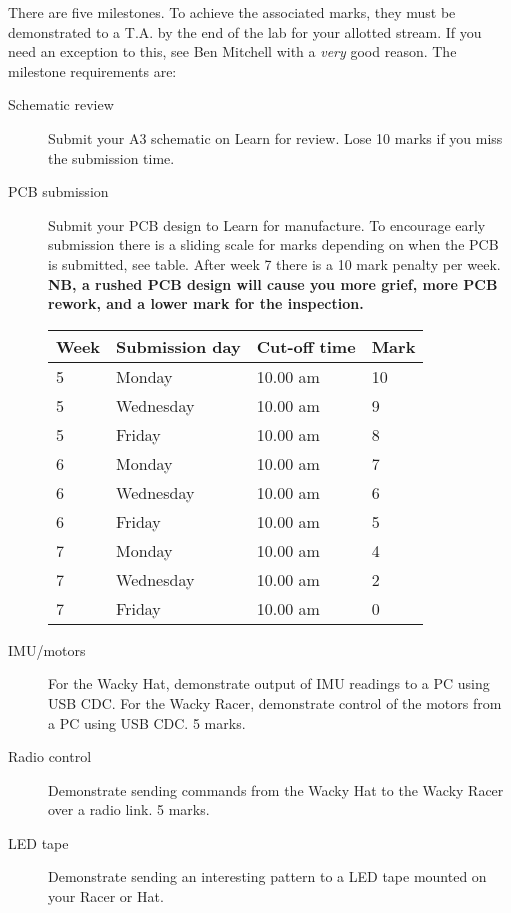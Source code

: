 \documentclass[11pt, a4paper]{article}
\begin{document}
There are five milestones.  To achieve the associated marks, they must
be demonstrated to a T.A. by the end of the lab for your allotted
stream.  If you need an exception to this, see Ben Mitchell with a
\emph{very} good reason.  The milestone requirements are:
%
\begin{description}
\item [Schematic review] Submit your A3 schematic on Learn for
  review.  Lose 10 marks if you miss the submission time.

\item [PCB submission] Submit your PCB design to Learn for
  manufacture.  To encourage early submission there is a sliding scale
  for marks depending on when the PCB is submitted, see table.  After
  week 7 there is a 10 mark penalty per week.  \textbf{NB, a rushed
    PCB design will cause you more grief, more PCB rework, and a lower
    mark for the inspection.}

  \begin{tabular}{llll}
    Week & Submission day & Cut-off time  & Mark \\ \hline
    5    & Monday       & 10.00 am & 10 \\
    5    & Wednesday    & 10.00 am & 9 \\
    5    & Friday       & 10.00 am & 8 \\
    6    & Monday       & 10.00 am & 7 \\
    6    & Wednesday    & 10.00 am & 6 \\
    6    & Friday       & 10.00 am & 5  \\
    7    & Monday       & 10.00 am & 4 \\
    7    & Wednesday    & 10.00 am & 2 \\
    7    & Friday       & 10.00 am & 0 \\        
  \end{tabular}

  
\item [IMU/motors] For the Wacky Hat, demonstrate output of IMU
  readings to a PC using USB CDC.  For the Wacky Racer, demonstrate
  control of the motors from a PC using USB CDC.  5 marks.

\item[Radio control] Demonstrate sending commands from the Wacky Hat
  to the Wacky Racer over a radio link.  5 marks.

\item[LED tape] Demonstrate sending an interesting pattern to a LED
  tape mounted on your Racer or Hat.
\end{description}
\end{document}
